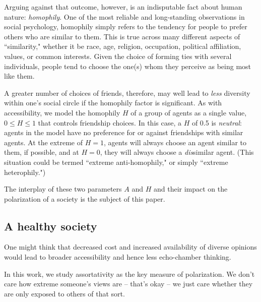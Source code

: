 Arguing against that outcome, however, is an indisputable fact about human
nature: \textit{homophily}. One of the most reliable and long-standing
observations in social psychology, homophily simply refers to the tendency for
people to prefer others who are similar to them.\cite{mcpherson_birds_2001}
This is true across many different aspects of ``similarity," whether it be
race, age, religion, occupation, political affiliation, values, or common
interests. Given the choice of forming ties with several individuals, people
tend to choose the one(s) whom they perceive as being most like them. 

A greater number of choices of friends, therefore, may well lead to
\textit{less} diversity within one's social circle if the homophily factor is
significant. As with accessibility, we model the homophily $H$ of a group of
agents as a single value, $0 \leq H \leq 1$ that controls friendship choices.
In this case, a $H$ of 0.5 is \textit{neutral}: agents in the model have no
preference for or against friendships with similar agents. At the extreme of
$H=1$, agents will always choose an agent similar to them, if possible, and at
$H=0$, they will always choose a \textit{dis}similar agent. (This situation
could be termed ``extreme anti-homophily," or simply ``extreme heterophily.")

The interplay of these two parameters $A$ and $H$ and their impact on the
polarization of a society is the subject of this paper.



\subsection{A healthy society}



One might think that decreased cost and increased availability of diverse
opinions would lead to broader accessibility and hence less echo-chamber thinking.


In this work, we study assortativity as the key measure of polarization. We
don't care how extreme someone's views are -- that's okay -- we just care
whether they are only exposed to others of that sort.
